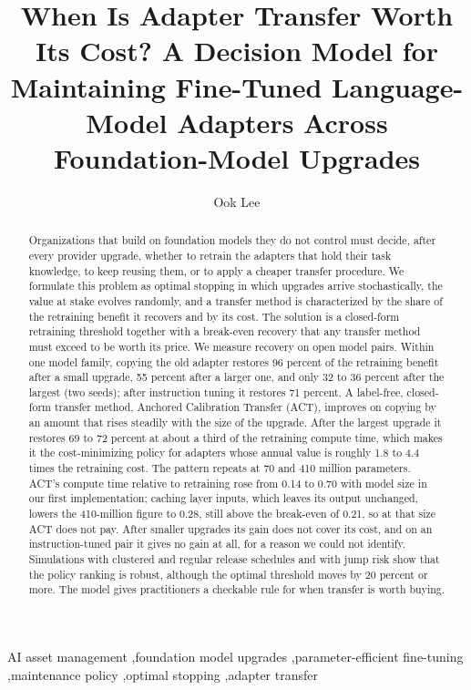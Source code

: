 \documentclass[preprint,12pt,authoryear]{elsarticle}
\begin{document}
\begin{frontmatter}

\title{When Is Adapter Transfer Worth Its Cost? A Decision Model for Maintaining Fine-Tuned Language-Model Adapters Across Foundation-Model Upgrades}

\author[inst1]{Ook Lee}
\address[inst1]{Department of Information System, Hanyang University, Seoul, Republic of Korea}

\begin{abstract}
Organizations that build on foundation models they do not control must decide, after every provider upgrade, whether to retrain the adapters
that hold their task knowledge, to keep reusing them, or to apply a cheaper transfer procedure. We formulate this problem as optimal stopping in which
upgrades arrive stochastically, the value at stake evolves randomly, and a transfer method is characterized by the share of the retraining benefit
it recovers and by its cost. The solution is a closed-form retraining threshold together with a break-even recovery that any transfer method must exceed
to be worth its price. We measure recovery on open model pairs. Within one model family, copying the old adapter restores 96 percent of the retraining benefit
after a small upgrade, 55 percent after a larger one, and only 32 to 36 percent after the largest (two seeds); after instruction tuning it restores 71 percent.
A label-free, closed-form transfer method, Anchored Calibration Transfer (ACT), improves on copying by an amount that rises steadily with the size of the upgrade.
After the largest upgrade it restores 69 to 72 percent at about a third of the retraining compute time, which makes it the cost-minimizing policy for adapters whose annual value is
roughly 1.8 to 4.4 times the retraining cost. The pattern repeats at 70 and 410 million parameters. ACT's compute time relative to retraining rose from 0.14 to 0.70 with model size in our first implementation; caching layer inputs, which leaves its output unchanged, lowers the 410-million figure to 0.28, still above the break-even of 0.21, so at that size ACT does not pay. After smaller upgrades its gain does not cover its cost, and on an instruction-tuned pair it gives no gain at all, for a reason we could not identify.
Simulations with clustered and regular release schedules and with jump risk show that the policy ranking is robust, although the optimal threshold moves by 20 percent or more.
The model gives practitioners a checkable rule for when transfer is worth buying.
\end{abstract}

\begin{keyword}
AI asset management \sep foundation model upgrades \sep parameter-efficient fine-tuning \sep maintenance policy \sep optimal stopping \sep adapter transfer
\end{keyword}

\end{frontmatter}
\end{document}
